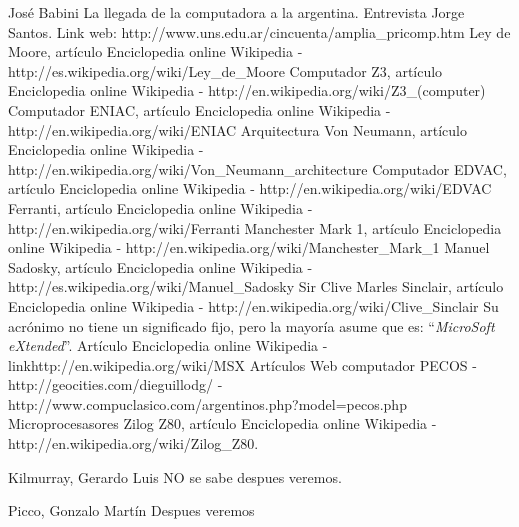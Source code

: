 \documentclass[%
 	final,
%
	notitlepage,
	narroweqnarray,
	inline,
 	twoside,
	]{ieee}
\newcommand{\link}[1]{\textit{}{#1}}
\begin{document}
\begin{thebibliography}{1}

 Jos\'e Babini La llegada de la computadora a la argentina.
 Entrevista Jorge Santos.
 Link web: \link{http://www.uns.edu.ar/cincuenta/amplia\_pricomp.htm}
 Ley de Moore, art\'iculo Enciclopedia online Wikipedia -\link{http://es.wikipedia.org/wiki/Ley\_de\_Moore}
 Computador Z3, art\'iculo Enciclopedia online Wikipedia - \link{http://en.wikipedia.org/wiki/Z3\_(computer)}
 Computador ENIAC, art\'iculo Enciclopedia online Wikipedia - \link{http://en.wikipedia.org/wiki/ENIAC}
 Arquitectura Von Neumann, art\'iculo Enciclopedia online Wikipedia - \link{http://en.wikipedia.org/wiki/Von\_Neumann\_architecture}
 Computador EDVAC, art\'iculo Enciclopedia online Wikipedia - \link{http://en.wikipedia.org/wiki/EDVAC}
 Ferranti, art\'iculo Enciclopedia online Wikipedia - \link{http://en.wikipedia.org/wiki/Ferranti}
 Manchester Mark 1, art\'iculo Enciclopedia online Wikipedia - \link{http://en.wikipedia.org/wiki/Manchester\_Mark\_1}
 Manuel Sadosky, art\'iculo Enciclopedia online Wikipedia - \link{http://es.wikipedia.org/wiki/Manuel\_Sadosky}
 Sir Clive Marles Sinclair, art\'iculo Enciclopedia online Wikipedia - \link{http://en.wikipedia.org/wiki/Clive\_Sinclair}
 Su acr\'onimo no tiene un significado fijo, pero la mayor\'ia asume que es: ``\textit{MicroSoft eXtended}''. Art\'iculo Enciclopedia online Wikipedia - link{http://en.wikipedia.org/wiki/MSX}
 Art\'iculos Web computador PECOS - \link{http://geocities.com/dieguillodg/} - \link{http://www.compuclasico.com/argentinos.php?model=pecos.php}
 Microprocesasores Zilog Z80, art\'iculo Enciclopedia online Wikipedia - \link{http://en.wikipedia.org/wiki/Zilog\_Z80}.


\end{thebibliography}


\begin{biography}{Kilmurray, Gerardo Luis} 
NO se sabe despues veremos.
\end{biography}


\begin{biography}{Picco, Gonzalo Mart\'in} 
Despues veremos
\end{biography}
\end{document}
